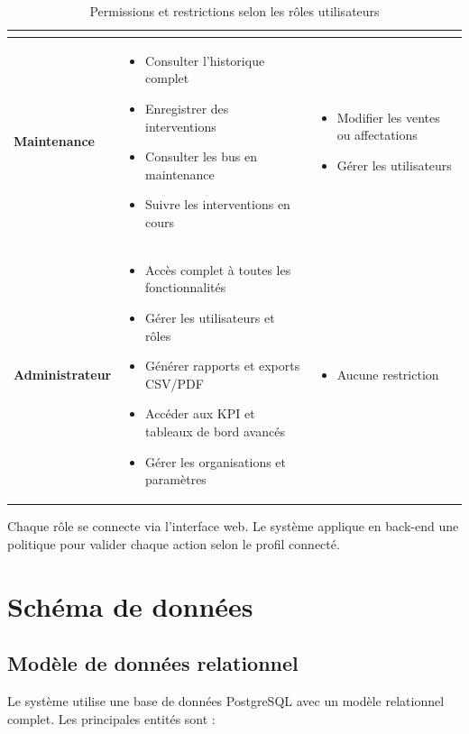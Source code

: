 \documentclass[a4paper, 12pt]{book}
\begin{document}
\begin{table}[H]
\begin{tabular}{|l|p{6.2cm}|p{6.2cm}|}
\begin{itemize}
\end{itemize} \\
\hline
\textbf{Maintenance} &
\begin{itemize}
    \item Consulter l'historique complet
    \item Enregistrer des interventions
    \item Consulter les bus en maintenance
    \item Suivre les interventions en cours
\end{itemize} &
\begin{itemize}
    \item Modifier les ventes ou affectations
    \item Gérer les utilisateurs
\end{itemize} \\
\hline
\textbf{Administrateur} &
\begin{itemize}
    \item Accès complet à toutes les fonctionnalités
    \item Gérer les utilisateurs et rôles
    \item Générer rapports et exports CSV/PDF
    \item Accéder aux KPI et tableaux de bord avancés
    \item Gérer les organisations et paramètres
\end{itemize} &
\begin{itemize}
    \item Aucune restriction
\end{itemize} \\
\hline
\end{tabular}
\caption{Permissions et restrictions selon les rôles utilisateurs}
\end{table}

Chaque rôle se connecte via l'interface web. Le système applique en back-end une politique pour valider chaque action selon le profil connecté.

\section{Schéma de données}
\vspace{-0.4cm}
\subsection{Modèle de données relationnel}

Le système utilise une base de données PostgreSQL avec un modèle relationnel complet. Les principales entités sont :
\end{document}
